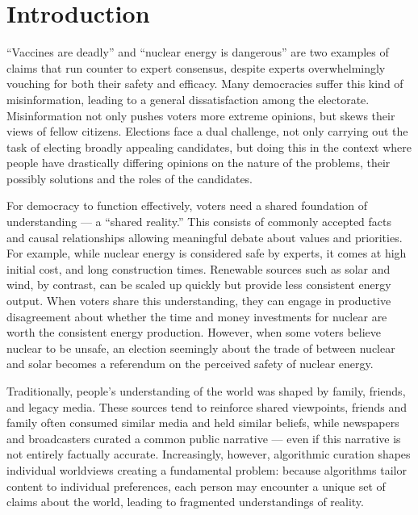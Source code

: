 \newpage
\chapter{Introduction}
\label{Introduction}

``Vaccines are deadly'' and ``nuclear energy is dangerous'' are two examples of
claims that run counter to expert consensus, despite experts overwhelmingly
vouching for both their safety and efficacy. Many democracies suffer this kind
of misinformation, leading to a general dissatisfaction among the electorate.
Misinformation not only pushes voters more extreme opinions, but skews their
views of fellow citizens. Elections face a dual challenge, not only carrying
out the task of electing broadly appealing candidates, but doing this in the
context where people have drastically differing opinions on the nature of the
problems, their possibly solutions and the roles of the candidates.

For democracy to function effectively, voters need a shared foundation of
understanding --- a ``shared reality.'' This consists of commonly accepted
facts and causal relationships allowing meaningful debate about values and
priorities. For example, while nuclear energy is considered safe by experts, it
comes at high initial cost, and long construction times.
Renewable sources such as solar and wind, by contrast, can be scaled up quickly but provide less
consistent energy output. When voters share this understanding,
they can engage in productive disagreement about whether the time and money
investments for nuclear are worth the consistent energy production. However,
when some voters believe nuclear to be unsafe, an election seemingly about the
trade of between nuclear and solar becomes a referendum on the perceived safety
of nuclear energy.

Traditionally, people's understanding of the world was shaped by family, friends,
and legacy media. These sources tend to reinforce shared viewpoints, friends
and family often consumed similar media and held similar beliefs, while
newspapers and broadcasters curated a common public narrative --- even if this narrative is not entirely factually accurate. Increasingly, however, algorithmic curation
shapes individual worldviews creating a fundamental problem: because algorithms
tailor content to individual preferences, each person may encounter a unique
set of claims about the world, leading to fragmented understandings of reality.

